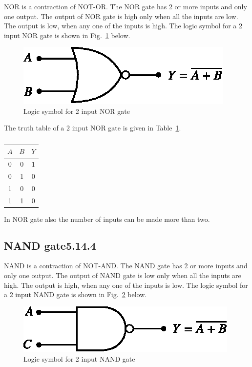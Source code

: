 NOR is a contraction of NOT-OR. The NOR gate has 2 or more inputs and only one output. The output of NOR gate is high only when all the inputs are low. The output is low, when any one of the inputs is high. The logic symbol for a 2 input NOR gate is shown in Fig.~\ref{fig5.12} below.
\begin{figure}[H]
\centering
\includegraphics{chap5/fig5.13.eps}
\caption{Logic symbol for 2 input NOR gate}\label{fig5.12}
\end{figure}

The truth table of a 2 input NOR gate is given in Table~\ref{tab5.12a}.
\begin{table}[H]
\centering
\caption{}\label{tab5.12a}
\tabcolsep=10pt
\renewcommand{\arraystretch}{1.05}
\begin{tabular}{|cc|c|}
\hline
\boldmath$A$ & \boldmath$B$ & \boldmath$Y$\\
\hline
0 & 0 & 1\\
0 & 1 & 0\\
1 & 0 & 0\\
1 & 1 & 0\\
\hline
\end{tabular}
\end{table}
In NOR gate also the number of inputs can be made more than two.

\vfill\eject



\subsection{NAND gate5.14.4}

NAND is a contraction of NOT-AND. The NAND gate has 2 or more inputs and only one output. The output of NAND gate is low only when all the inputs are high. The output is high, when any one of the inputs is low. The logic symbol for a 2 input NAND gate is shown in Fig.~\ref{fig5.13} below.
\begin{figure}[H]
\centering
\includegraphics{chap5/fig5.14.eps}
\caption{Logic symbol for 2 input NAND gate}\label{fig5.13}
\end{figure}

